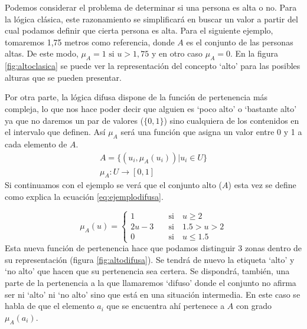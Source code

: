  Podemos considerar el problema de determinar si una persona es alta o no. Para la lógica clásica, este razonamiento se simplificará en buscar un valor a partir del cual podamos definir que cierta persona es alta. Para el siguiente ejemplo, tomaremos 1,75 metros como referencia, donde $A$ es el conjunto de las personas altas. De este modo, $\mu_{A}=1 \text{ si } u>1,75$ y en otro caso $\mu_{A}=0$. En la figura \ref{fig:altoclasica} se puede ver la representación del concepto `alto' para las posibles alturas que se pueden presentar.



Por otra parte, la lógica difusa dispone de la función de pertenencia más compleja, lo que nos hace poder decir que alguien es `poco alto' o `bastante alto' ya que no daremos un par de valores ($\{0,1\}$) sino cualquiera de los contenidos en el intervalo que definen. Así $\mu_{A}$ será una función que asigna un valor entre 0 y 1 a cada elemento de $A$.\begin{equation}\label{eq:logicadifusa}
\begin{aligned} 
	A = \{(u_{i}, \mu_{A}(u_{i})) | u_{i}\in U\}\\
	\mu_{A}:U\rightarrow [0,1]
\end{aligned}
\end{equation}                
Si continuamos con el ejemplo se verá que el conjunto alto ($A$) esta vez se define como explica la ecuación \ref{eq:ejemplodifusa}. 

\begin{equation}\label{eq:ejemplodifusa}                
	\mu_{A}(u) = \left\{ \begin{aligned}
		1 \quad&\text{si}\quad u\geq 2\\
		2u - 3 \quad&\text{si}\quad 1.5>u>2\\
		0 \quad&\text{si}\quad u\leq 1.5
 	\end{aligned}\right.
 \end{equation}           
Esta nueva función de pertenencia hace que podamos distinguir 3 zonas dentro de su representación (figura \ref{fig:altodifusa}). Se tendrá de nuevo la etiqueta `alto' y `no alto' que hacen que su pertenencia sea certera. Se dispondrá, también, una parte de la pertenencia a la que llamaremos `difuso' donde el conjunto no afirma ser ni `alto' ni `no alto' sino que está en una situación intermedia. En este caso se habla de que el elemento $a_{i}$ que se encuentra ahí pertenece a $A$ con grado $\mu_{A}(a_{i})$.
                
